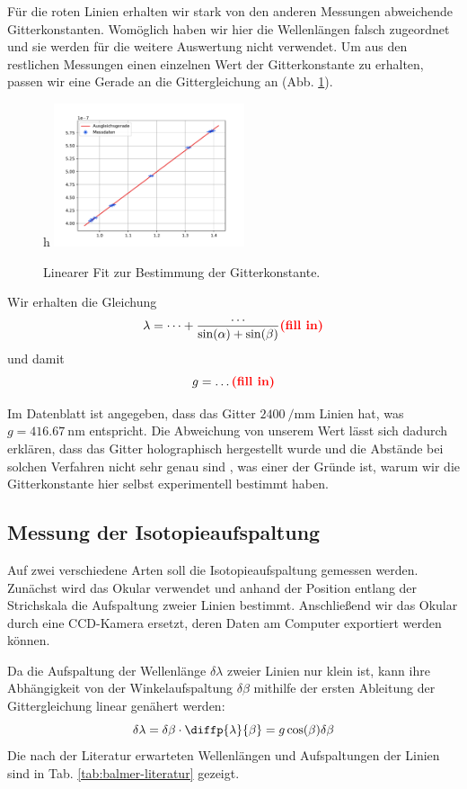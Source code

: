 \documentclass{article}
\newcommand{\defc}{black}
\newcommand{\colorT}[2][blue]{\color{#1}{#2}\color{\defc}}
\newcommand{\todo}[1]{\colorT[red]{\textbf{(#1)}}}
\begin{document}
Für die roten Linien erhalten wir stark von den anderen Messungen abweichende Gitterkonstanten.
Womöglich haben wir hier die Wellenlängen falsch zugeordnet und sie werden für die weitere Auswertung nicht verwendet.
Um aus den restlichen Messungen einen einzelnen Wert der Gitterkonstante zu erhalten, passen wir eine Gerade
an die Gittergleichung an (Abb. \ref{fig:fit-gitterkonstante}).
\begin{figure}{h}
  \centering
  \includegraphics[width=0.5\textwidth]{fit-gitterkonstante}
  \caption{Linearer Fit zur Bestimmung der Gitterkonstante.}
  \label{fig:fit-gitterkonstante}
\end{figure}
Wir erhalten die Gleichung
\[
  \lambda = \dots + \frac{\dots}{\sin(\alpha)+\sin(\beta)} \todo{fill in}
\]
und damit
\[
  g = \dots \todo{fill in}
\]

Im Datenblatt \cite{leybold-balmer} ist angegeben,
dass das Gitter $\SI{2400}{\per\mm}$ Linien hat, was $g = \SI{416.67}{\nm}$ entspricht.
Die Abweichung von unserem Wert lässt sich dadurch erklären, dass das Gitter holographisch hergestellt wurde und
die Abstände bei solchen Verfahren nicht sehr genau sind \cite{Anleitung} \todo{stimmt das?}, was einer der Gründe ist,
warum wir die Gitterkonstante hier selbst experimentell bestimmt haben.


\subsection{Messung der Isotopieaufspaltung}
Auf zwei verschiedene Arten soll die Isotopieaufspaltung gemessen werden. Zunächst wird das Okular verwendet und anhand
der Position entlang der Strichskala die Aufspaltung zweier Linien bestimmt. Anschließend wir das Okular durch eine
CCD-Kamera ersetzt, deren Daten am Computer exportiert werden können.

Da die Aufspaltung der Wellenlänge $\delta \lambda$ zweier Linien nur klein ist, kann ihre Abhängigkeit von der
Winkelaufspaltung $\delta\beta$ mithilfe der ersten Ableitung der Gittergleichung linear genähert werden:
\begin{equation}
  \delta\lambda = \delta\beta \cdot \diffp{\lambda}{\beta} = g\cos(\beta)\delta\beta \label{eq:balmer-aufspaltung}
\end{equation}
Die nach der Literatur erwarteten Wellenlängen und Aufspaltungen der Linien sind in Tab. \ref{tab:balmer-literatur} gezeigt.
\end{document}
